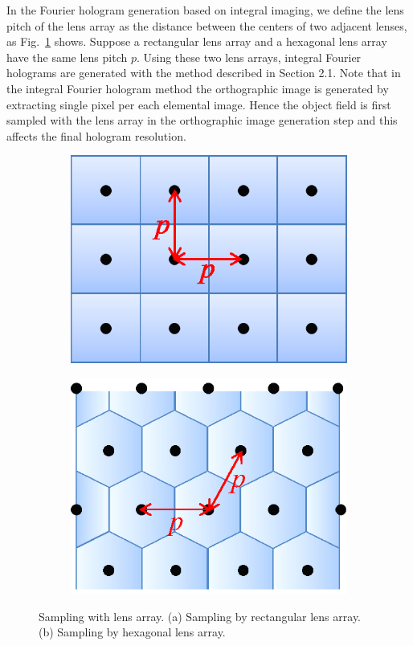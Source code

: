 \documentclass[10pt,letterpaper]{article}
\begin{document}
In the Fourier hologram generation based on integral imaging, we define the lens pitch of the lens array as the distance between the centers of two adjacent lenses, as Fig.~\ref{fig_3} shows. Suppose a rectangular lens array and a hexagonal lens array have the same lens pitch $p$. Using these two lens arrays, integral Fourier holograms are generated with the method described in Section 2.1. Note that in the integral Fourier hologram method the orthographic image is generated by extracting single pixel per each elemental image. Hence the object field is first sampled with the lens array in the orthographic image generation step and this affects the final hologram resolution. 
\begin{figure}[htb]
\centering
	\captionsetup[subfigure]{justification=centering}
	\begin{subfigure}[b]{0.35\linewidth}
	\centering
	\includegraphics[width=1\columnwidth]{fig3_a}
	\caption{}
	\end{subfigure}
	\begin{subfigure}[b]{0.35\linewidth}
	\includegraphics[width=1\columnwidth]{fig3_b}
	\centering
	\caption{}
	\end{subfigure}
\caption{Sampling with lens array. (a) Sampling by rectangular lens array. (b) Sampling by hexagonal lens array.}
\label{fig_3}
\end{figure}
\end{document}
